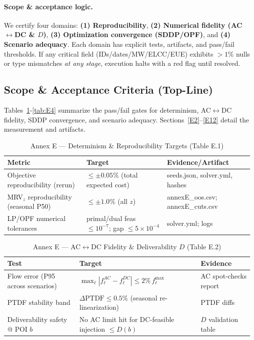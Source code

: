 \documentclass[11pt]{article}
\numberwithin{equation}{section}
\theoremstyle{definition}
\theoremstyle{remark}
\begin{document}
\paragraph{Scope \& acceptance logic.}
We certify four domains: \textbf{(1) Reproducibility}, \textbf{(2) Numerical fidelity (AC$\leftrightarrow$DC \& $D$)}, \textbf{(3) Optimization convergence (SDDP/OPF)}, and \textbf{(4) Scenario adequacy}. Each domain has explicit tests, artifacts, and pass/fail thresholds. If any critical field (IDs/dates/MW/ELCC/EUE) exhibits $>\!1\%$ nulls or type mismatches \emph{at any stage}, execution halts with a red flag until resolved.

\subsection{ Scope \& Acceptance Criteria (Top-Line)}
\label{E1}
Tables~\ref{tab:E1}-\ref{tab:E4} summarize the pass/fail gates for determinism, AC$\leftrightarrow$DC fidelity, SDDP convergence, and scenario adequacy. Sections~\ref{E2}--\ref{E12} detail the measurement and artifacts.

\begin{table}[h]
\centering
\caption{Annex E — Determinism \& Reproducibility Targets (Table E.1)}
\label{tab:E1}
\begin{tabular}{@{}lll@{}}
\toprule
\textbf{Metric} & \textbf{Target} & \textbf{Evidence/Artifact} \\
\midrule
Objective reproducibility (rerun) & $\le \pm 0.05\%$ (total expected cost) & seeds.json, solver.yml, hashes \\
MRV$_z$ reproducibility (seasonal P50) & $\le \pm 1.0\%$ (all $z$) & annexE\_oos.csv; annexE\_cuts.csv \\
LP/OPF numerical tolerances & primal/dual feas $\le 10^{-7}$; gap $\le 5\times 10^{-4}$ & solver.yml; logs \\
\bottomrule
\end{tabular}
\end{table}

\begin{table}[h]
\centering
\caption{Annex E — AC$\leftrightarrow$DC Fidelity \& Deliverability $D$ (Table E.2)}
\label{tab:E2}
\begin{tabular}{@{}lll@{}}
\toprule
\textbf{Test} & \textbf{Target} & \textbf{Evidence} \\
\midrule
Flow error (P95 across scenarios) & $\max_\ell |f^{AC}_\ell - f^{DC}_\ell| \le 2\%\,f^{\max}_\ell$ & AC spot-checks report \\
PTDF stability band & $\Delta\mathrm{PTDF} \le 0.5\%$ (seasonal re-linearization) & PTDF diffs \\
Deliverability safety @ POI $b$ & No AC limit hit for DC-feasible injection $\le D(b)$ & $D$ validation table \\
\bottomrule
\end{tabular}
\end{table}
\end{document}
